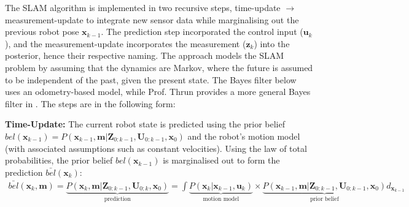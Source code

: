 The SLAM algorithm is implemented in two recursive steps, time-update $\rightarrow$ measurement-update to integrate new sensor data while marginalising out the previous robot pose $\mathbf{x}_{k-1}$. The prediction step incorporated the control input ($\mathbf{u}_k$), and the measurement-update incorporates the measurement ($\mathbf{z}_k$) into the posterior, hence their respective naming. The approach models the SLAM problem by assuming that the dynamics are Markov, where the future is assumed to be independent of the past, given the present state. The Bayes filter below uses an odometry-based model, while Prof. Thrun provides a more general Bayes filter in \cite{Thrun2006}. The steps are in the following form:


\textbf{Time-Update:} The current robot state is predicted using the prior belief $bel(\mathbf{x}_{k-1}) = P(\mathbf{x}_{k-1},\mathbf{m}|\mathbf{Z}_{0:k-1}, \mathbf{U}_{0:k-1}, \mathbf{x}_{0})$ and the robot’s motion model (with associated assumptions such as constant velocities). Using the law of total probabilities, the prior belief $bel(\mathbf{x}_{k-1})$ is marginalised out to form the prediction $\bar{bel}(\mathbf{x}_k)$:
\begin{equation}
\begin{split}
    \bar{bel}(\mathbf{x}_k, \mathbf{m}) = \underbrace{P(\mathbf{x}_k,\mathbf{m}|\mathbf{Z}_{0:k-1}, \mathbf{U}_{0:k}, \mathbf{x}_0)}_{\text{prediction}} = \int  \underbrace{P(\mathbf{x}_k|\mathbf{x}_{k-1},\mathbf{u}_k)}_{\text{motion model}} \times \underbrace{P(\mathbf{x}_{k-1},\mathbf{m}|\mathbf{Z}_{0:k-1}, \mathbf{U}_{0:k-1}, \mathbf{x}_0)}_{\text{prior belief}} d_{\mathbf{x}_{k-1}}
\end{split}
\label{eq:timeup}
\end{equation}

